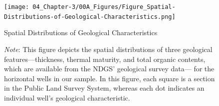 \begin{landscape}
    \begin{figure}[t!]
        \centering
        \texttt{[image: 04\_Chapter-3/00A\_Figures/Figure\_Spatial-Distributions-of-Geological-Characteristics.png]}
        \caption{Spatial Distributions of Geological Characteristics}
        \caption*{
        	{\small
            \textit{Note}: 
            This figure depicts the spatial distributions of three geological features---thickness, thermal maturity, and total organic contents, which are available from the NDGS' geological survey data--- for the horizontal wells in our sample. In this figure, each square is a section in the Public Land Survey System, whereas each dot indicates an individual well's geological characteristic.  
        }}
        \label{Figure:Spatial-Distributions-of-Geological-Characteristics}
    \end{figure}
\end{landscape}
